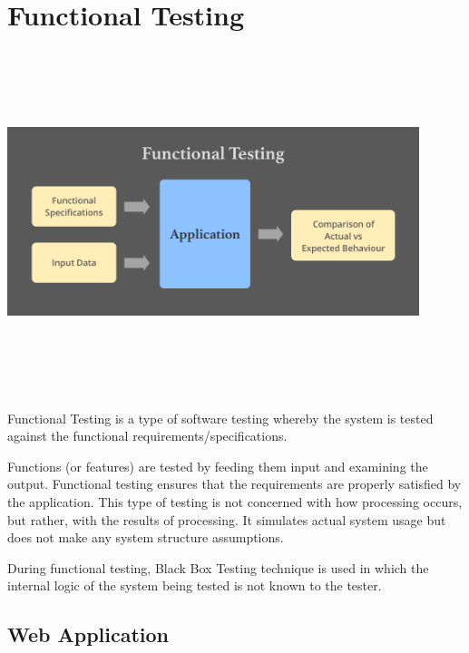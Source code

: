 \section{Functional Testing}
\begin{center}
    \includegraphics[width=12cm,height=10cm,keepaspectratio]{images/Functional-Testing-feature-image}
\end{center}
Functional Testing is a type of software testing whereby the system is tested 
against the functional requirements/specifications.

\par
\bigskip

Functions (or features) are tested by feeding them input and examining the 
output. Functional testing ensures that the requirements are properly satisfied 
by the application. This type of testing is not concerned with how processing 
occurs, but rather, with the results of processing. It simulates actual system 
usage but does not make any system structure assumptions.

\par
\bigskip

During functional testing, Black Box Testing technique is used in which the 
internal logic of the system being tested is not known to the tester.

\subsection{Web Application}


